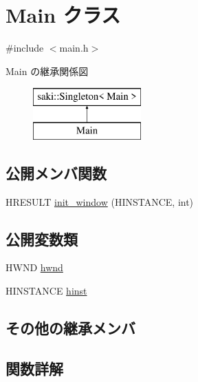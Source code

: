 \hypertarget{class_main}{}\section{Main クラス}
\label{class_main}


{\ttfamily \#include $<$main.\+h$>$}

Main の継承関係図\begin{figure}[H]
\begin{center}
\leavevmode
\includegraphics[height=2.000000cm]{class_main}
\end{center}
\end{figure}
\subsection*{公開メンバ関数}
\begin{DoxyCompactItemize}
\item 
H\+R\+E\+S\+U\+LT \mbox{\hyperlink{class_main_a73509ef41bc8441ce33ff8068a173f6b}{init\+\_\+window}} (H\+I\+N\+S\+T\+A\+N\+CE, int)
\end{DoxyCompactItemize}
\subsection*{公開変数類}
\begin{DoxyCompactItemize}
\item 
H\+W\+ND \mbox{\hyperlink{class_main_a511de4617f7e21d53dfa8bba5e8e40f6}{hwnd}}
\item 
H\+I\+N\+S\+T\+A\+N\+CE \mbox{\hyperlink{class_main_a7e08e3cceedf7301924454e77d6fe2b1}{hinst}}
\end{DoxyCompactItemize}
\subsection*{その他の継承メンバ}


\subsection{関数詳解}
\mbox{\label{class_main_a73509ef41bc8441ce33ff8068a173f6b}} 
